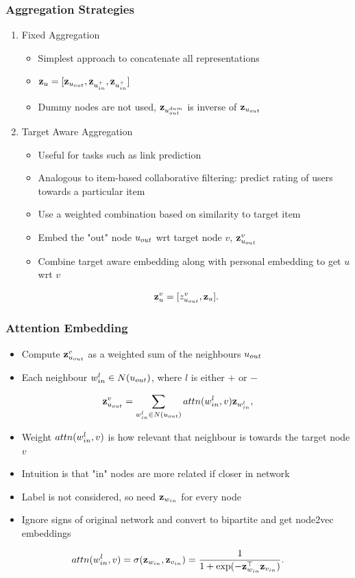 \documentclass{beamer}
\begin{document}
\begin{frame}
    \frametitle{Aggregation Strategies}
    \begin{enumerate}
        \item Fixed Aggregation
        \begin{itemize}
            \item Simplest approach to concatenate all representations
            \item $\mathbf{z}_{u} = [\mathbf{z}_{u_{out}},\mathbf{z}_{u_{in}^{+}},\mathbf{z}_{u_{in}^{+}}]$
            \item Dummy nodes are not used, $\mathbf{z}_{u_{out}^{dum}}$ is inverse of $\mathbf{z}_{u_{out}}$
        \end{itemize}
    \item Target Aware Aggregation
    \begin{itemize}
        \item Useful for tasks such as link prediction
        \item Analogous to item-based collaborative filtering: predict rating of users towards a particular item 
        \item Use a weighted combination based on similarity to target item
        \item Embed the "out" node $u_{out}$ wrt target node $v$, $\mathbf{z}_{u_{out}}^{v}$
        \item Combine target aware embedding along with personal embedding to get $u$ wrt $v$
    \end{itemize}
    \[ \mathbf{z}_{u}^{v} = [z_{u_{out}}^{v},\mathbf{z}_{u}].\]
    \end{enumerate}
\end{frame}

\begin{frame}
    \frametitle{Attention Embedding}
    \begin{itemize}
        \item Compute $\mathbf{z}_{u_{out}}^{v}$ as a weighted sum of the neighbours $u_{out}$
        \item Each neighbour $w_{in}^{l} \in N(u_{out})$, where $l$ is either $+$ or $-$
    \end{itemize}
    \[\mathbf{z}_{u_{out}}^{v}  = \sum_{w_{in}^{l} \in N(u_{out})} attn(w_{in}^{l},v)\mathbf{z}_{w_{in}^{l}},\]
    \begin{itemize}
        \item Weight $attn(w_{in}^{l},v)$ is how relevant that neighbour is towards the target node $v$
        \item Intuition is that "in" nodes are more related if closer in network
        \item Label is not considered, so need $\mathbf{z}_{w_{in}}$ for every node 
        \item Ignore signs of original network and convert to bipartite and get node2vec embeddings
    \end{itemize}    
    \[ attn(w_{in}^{l},v) = \sigma(\mathbf{z}_{w_{in}},\mathbf{z}_{v_{in}}) = \frac{1}{1+\exp(-\mathbf{z}_{w_{in}}^{\top}\mathbf{z}_{v_{in}})} .
    \]
\end{frame}
\end{document}
